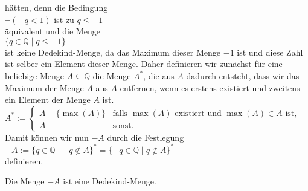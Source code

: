 hätten, denn die Bedingung 
\\[0.2cm]
\hspace*{1.3cm}
$\neg (-q < 1)$ \quad ist zu  \quad $q \leq -1$
\\[0.2cm]
äquivalent und die Menge
\\[0.2cm]
\hspace*{1.3cm}
$\{ q \in \mathbb{Q} \mid q \leq -1 \}$
\\[0.2cm]
ist keine Dedekind-Menge, da das Maximum dieser Menge $-1$ ist und diese Zahl ist selber ein Element
dieser Menge.  Daher definieren wir zunächst für eine beliebige Menge $A \subseteq \mathbb{Q}$ die
Menge $A^*$, die aus $A$ dadurch entsteht, dass wir das Maximum der Menge $A$ aus $A$ entfernen,
wenn es erstens existiert und zweitens ein Element der Menge $A$ ist.
\\[0.2cm]
\hspace*{1.3cm}
$A^* := \left\{
\begin{array}{ll}
 A - \{ \max(A) \} & \mbox{falls $\max(A)$ existiert und $\max(A) \in A$ ist,} \\
 A                 & \mbox{sonst}.
\end{array}\right.
$
\\[0.2cm]
Damit können wir nun $-A$ durch die Festlegung
\\[0.2cm]
\hspace*{1.3cm}
$-\!A := \{ q \in \mathbb{Q} \mid -q \not\in A \}^* = \{ -q \in \mathbb{Q} \mid q \not\in A \}^*$
\\[0.2cm]
definieren.


\begin{Satz}
  Die Menge $-\!A$ ist eine Dedekind-Menge.  \eox
\end{Satz}

